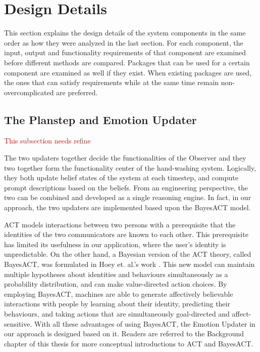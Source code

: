 \section{Design Details}
\label{sec:design-details}

This section explains the design details of the system components in the same order as how they were analyzed in the last section. For each component, the input, output and functionality requirements of that component are examined before different methods are compared. Packages that can be used for a certain component are examined as well if they exist. When existing packages are used, the ones that can satisfy requirements while at the same time remain non-overcomplicated are preferred.

\subsection{The Planstep and Emotion Updater}

\textcolor{red}{This subsection needs refine}

The two updaters together decide the functionalities of the Observer and they two together form the functionality center of the hand-washing system. Logically, they both update belief states of the system at each timestep, and compute prompt descriptions based on the beliefs. From an engineering perspective, the two can be combined and developed as a single reasoning engine. In fact, in our approach, the two updaters are implemented based upon the BayesACT model.

ACT models interactions between two persons with a prerequisite that the identities of the two communicators are known to each other. This prerequisite has limited its usefulness in our application, where the user's identity is unpredictable. On the other hand, a Bayesian version of the ACT theory, called BayesACT, was formulated in Hoey et. al.'s work \cite{hoey2013bayesian}. This new model can maintain multiple hypotheses about identities and behaviours simultaneously as a probability distribution, and can make value-directed action choices. By employing BayesACT, machines are able to generate affectively believable interactions with people by learning about their identity, predicting their behaviours, and taking actions that are simultaneously goal-directed and affect-sensitive. With all these advantages of using BayesACT, the Emotion Updater in our approach is designed based on it. Readers are referred to the Background chapter of this thesis for more conceptual introductions to ACT and BayesACT.

